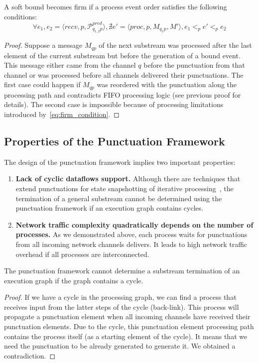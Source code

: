 \begin{lemma}
A soft bound becomes firm if a process event order satisfies the following conditions:
\begin{equation}
\label{eq:firm_condition}
\forall e_1, e_2 = \langle recv, p, \mathcal{P}^{pred}_{q_{1,2}p} \rangle, \nexists e' = \langle proc, p, M_{q_1p}, M' \rangle, e_1 <_p e' <_p e_2
\end{equation}
\end{lemma}
\begin{proof}
Suppose a message $M_{qp}$ of the next substream was processed after the last element of the current substream but before the generation of a bound event. This message either came from the channel $q$ before the punctuation from that channel or was processed before all channels delivered their punctuations. The first case could happen if $M_{qp}$ was reordered with the punctuation along the processing path and contradicts FIFO processing logic (see previous proof for details). The second case is impossible because of processing limitations introduced by~\ref{eq:firm_condition}.
\end{proof}

\subsection{Properties of the Punctuation Framework}

The design of the punctuation framework implies two important properties:

\begin{enumerate}
    \item {\bf Lack of cyclic dataflows support.} Although there are techniques that extend punctuations for state snapshotting of iterative processing~\cite{Carbone:2017:SMA:3137765.3137777}, the termination of a general substream cannot be determined using the punctuation framework if an execution graph contains cycles.
    \item {\bf Network traffic complexity quadratically depends on the number of processes.} As we demonstrated above, each process waits for punctuations from all incoming network channels delivers. It leads to high network traffic overhead if all processes are interconnected.
\end{enumerate}

\begin{lemma}
The punctuation framework cannot determine a substream termination of an execution graph if the graph contains a cycle.
\end{lemma}
\begin{proof}
If we have a cycle in the processing graph, we can find a process that receives input from the latter steps of the cycle (back-link). This process will propagate a punctuation element when all incoming channels have received their punctuation elements. Due to the cycle, this punctuation element processing path contains the process itself (as a starting element of the cycle). It means that we need the punctuation to be already generated to generate it. We obtained a contradiction.
\end{proof}

